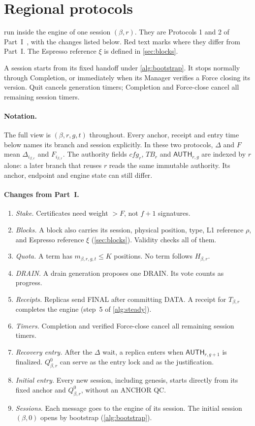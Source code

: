 \documentclass[11pt,a4paper]{article}
\newcommand{\RR}[1]{{\color{rrRed}#1}}
\newcommand{\TB}{\mathit{TB}}
\newcommand{\tagg}[1]{\ensuremath{\mathsf{#1}}}
\newcounter{protocol}
\begin{document}
\section{Regional protocols}
\label{sec:protocols}
 run inside the engine of one session
$(\beta,r)$. They are Protocols 1 and 2 of Part~I~\cite{part1}, with the
changes listed below. \RR{Red text} marks where they differ from Part~I.
The Espresso reference $\xi$ is defined in \cref{sec:blocks}.

A session starts from its fixed handoff under \cref{alg:bootstrap}.
It stops normally through Completion, or immediately when its Manager
verifies a Force closing its version. Quit cancels generation timers;
Completion and Force-close cancel all remaining session timers.

\paragraph{Notation.}
The full view is $(\beta,r,g,t)$ throughout. Every anchor, receipt and
entry time below names its branch and session explicitly. In these two
protocols, $\Delta$ and $F$ mean $\Delta_{i_{\beta,r}}$ and
$F_{i_{\beta,r}}$. The authority fields $\mathit{cfg}_r$, $\TB_r$ and
$\tagg{AUTH}_{r,g}$ are indexed by $r$ alone: a later branch that reuses
$r$ reads the same immutable authority. Its anchor, endpoint and engine
state can still differ.

\paragraph{Changes from Part~I.}
\begin{enumerate}[label=\arabic*.]
\item \emph{Stake.} Certificates need weight $>F$, not $f+1$ signatures.
\item \emph{Blocks.} A block also carries its session, physical
position, type, L1 reference $\rho$, and Espresso reference $\xi$
(\cref{sec:blocks}). Validity checks all of them.
\item \emph{Quota.} A term has $m_{\beta,r,g,t}\le K$ positions. No term
follows $H_{\beta,r}$.
\item \emph{DRAIN.} A drain generation proposes one DRAIN. Its vote
counts as progress.
\item \emph{Receipts.} Replicas send FINAL after committing DATA. A
receipt for $T_{\beta,r}$ completes the engine (step~5 of \cref{alg:steady}).
\item \emph{Timers.} Completion and verified Force-close cancel all
remaining session timers.
\item \emph{Recovery entry.} After the $\Delta$ wait, a replica enters
when $\tagg{AUTH}_{r,g+1}$ is finalized. $Q_{\beta,r}^0$ can serve as the
entry lock and as the justification.
\item \emph{Initial entry.} Every new session, including genesis, starts
directly from its fixed anchor and $Q^0_{\beta,r}$, without an ANCHOR QC.
\item \emph{Sessions.} Each message goes to the engine of its session.
The initial session $(\beta,0)$ opens by bootstrap (\cref{alg:bootstrap}).
\end{enumerate}
\end{document}

